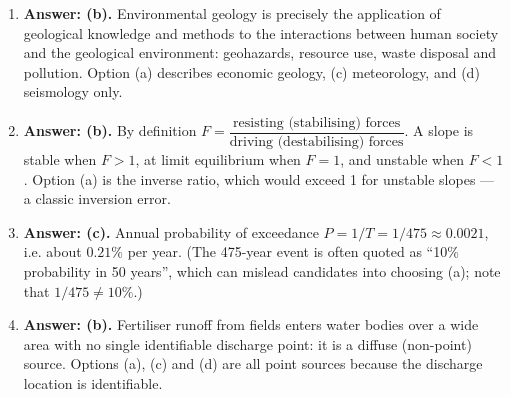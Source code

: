 \documentclass[11pt]{article}
\begin{document}
\begin{corrige}
\begin{enumerate}
\item \textbf{Answer: (b).} Environmental geology is precisely the application of geological knowledge and methods to the interactions between human society and the geological environment: geohazards, resource use, waste disposal and pollution. Option (a) describes economic geology, (c) meteorology, and (d) seismology only.
\item \textbf{Answer: (b).} By definition $F = \dfrac{\text{resisting (stabilising) forces}}{\text{driving (destabilising) forces}}$. A slope is stable when $F>1$, at limit equilibrium when $F=1$, and unstable when $F<1$. Option (a) is the inverse ratio, which would exceed 1 for unstable slopes — a classic inversion error.
\item \textbf{Answer: (c).} Annual probability of exceedance $P = 1/T = 1/475 \approx 0.0021$, i.e. about $0.21\%$ per year. (The 475-year event is often quoted as ``10\% probability in 50 years'', which can mislead candidates into choosing (a); note that $1/475 \neq 10\%$.)
\item \textbf{Answer: (b).} Fertiliser runoff from fields enters water bodies over a wide area with no single identifiable discharge point: it is a diffuse (non-point) source. Options (a), (c) and (d) are all point sources because the discharge location is identifiable.
\end{enumerate}
\end{corrige}
\end{document}
